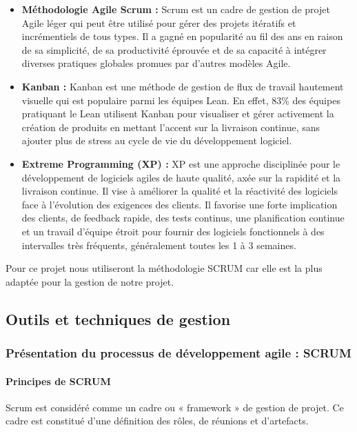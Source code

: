 \begin{itemize}
    \item \textbf{Méthodologie Agile Scrum : } Scrum  est un cadre de gestion de projet Agile léger qui peut être utilisé pour gérer des projets itératifs et incrémentiels de tous types. Il a gagné en popularité au fil des ans en raison de sa simplicité, de sa productivité éprouvée et de sa capacité à intégrer diverses pratiques globales promues par d'autres modèles Agile.
    \item \textbf{Kanban : } Kanban  est une méthode de gestion de flux de travail hautement visuelle qui est populaire parmi les équipes Lean. En effet, 83\% des équipes pratiquant le Lean utilisent Kanban pour visualiser et gérer activement la création de produits en mettant l'accent sur la livraison continue, sans ajouter plus de stress au cycle de vie du développement logiciel.
    \item \textbf{Extreme Programming (XP) : } XP est une approche disciplinée pour le développement de logiciels agiles de haute qualité, axée sur la rapidité et la livraison continue. Il vise à améliorer la qualité et la réactivité des logiciels face à l'évolution des exigences des clients. Il favorise une forte implication des clients, de feedback rapide, des tests continus, une planification continue et un travail d'équipe étroit pour fournir des logiciels fonctionnels à des intervalles très fréquents, généralement toutes les 1 à 3 semaines.
\end{itemize}

Pour ce projet nous utiliseront la méthodologie SCRUM car elle est la plus adaptée pour la gestion de notre projet.

\subsection{Outils et techniques de gestion}
\subsubsection{Présentation du processus de développement agile : SCRUM}
\paragraph{Principes de SCRUM}
Scrum est considéré comme un cadre ou « framework » de gestion de projet. Ce cadre est constitué d'une définition des rôles, de réunions et d'artefacts.

